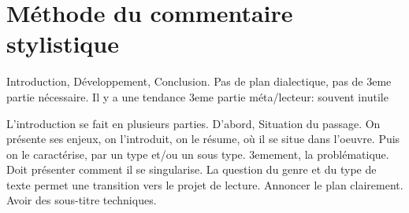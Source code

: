 \documentclass[a4paper]{report}
\theoremstyle{definition}
\theoremstyle{remark}
\begin{document}
\section{Méthode du commentaire stylistique} 
Introduction, Développement, Conclusion. Pas de plan dialectique, pas de 3eme partie nécessaire. Il y a une tendance 3eme partie méta/lecteur: souvent inutile \par

L'introduction se fait en plusieurs parties. D'abord, Situation du passage. On présente ses enjeux, on l'introduit, on le résume, où il se situe dans l'oeuvre. Puis on le caractérise, par un type et/ou un sous type. 3emement, la problématique. Doit présenter comment il se singularise. La question du genre et du type de texte permet une transition vers le projet de lecture. Annoncer le plan clairement. Avoir des sous-titre techniques.
\end{document}
